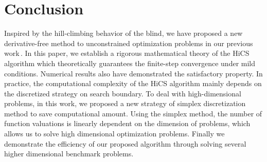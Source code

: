 \section{Conclusion}
\label{sec:conclusion}

Inspired by the hill-climbing behavior of the blind, we have
proposed a new derivative-free method to unconstrained
optimization problems in our previous work\,\cite{huang2017hill}. 
In this paper, we establish a rigorous mathematical theory of the HiCS
algorithm which theoretically guarantees the finite-step convergence
under mild conditions. Numerical results also have demonstrated
the satisfactory property. 
In practice, the computational complexity of the HiCS algorithm mainly
depends on the discretized strategy on search boundary.
To deal with high-dimensional problems, in this work, 
we proposed a new strategy of simplex
discretization method to save computational amount. Using the
simplex method, the number of function valuations is linearly
dependent on the dimension of problems,
which allows us to solve high dimensional optimization problems. 
Finally we demonstrate the efficiency of our proposed algorithm
through solving several higher dimensional benchmark problems.




